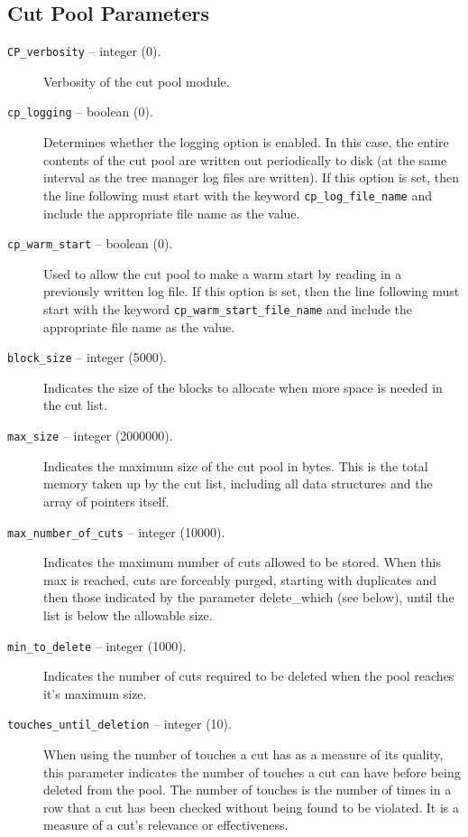 \subsection{Cut Pool Parameters}
\label{cut_pool_params}
\begin{description}

\item[{\tt CP\_verbosity} -- integer (0).]
Verbosity of the cut pool module.

\item[{\tt cp\_logging} -- boolean (0).]
Determines whether the logging option is enabled. In this case, the
entire contents of the cut pool are written out periodically to disk
(at the same interval as the tree manager log files are written). If
this option is set, then the line following must start with the
keyword {\tt cp\_log\_file\_name} and include the appropriate
file name as the value.

\item[{\tt cp\_warm\_start} -- boolean (0).]
Used to allow the cut pool to make a warm start by reading in a
previously written log file. If
this option is set, then the line following must start with the
keyword {\tt cp\_warm\_start\_file\_name} and include the appropriate
file name as the value.

\item[{\tt block\_size} -- integer (5000).]
Indicates the size of the blocks to allocate when more space is needed
in the cut list.

\item[{\tt max\_size} -- integer (2000000).]
Indicates the maximum size of the cut pool in bytes. This is the total
memory taken up by the cut list, including all data structures and the
array of pointers itself.

\item[{\tt max\_number\_of\_cuts} -- integer (10000).]
Indicates the maximum number of cuts allowed to be stored. When this
max is reached, cuts are forceably purged, starting with duplicates
and then those indicated by the parameter 
{delete_which} (see below), until the list is below the allowable size.

\item[{\tt min\_to\_delete} -- integer (1000).]
Indicates the number of cuts required to be deleted when the pool reaches
it's maximum size.

\item[{\tt touches\_until\_deletion} -- integer (10).]
When using the number of touches a cut has as a measure of its
quality, this parameter indicates the number of touches a cut can have
before being deleted from the pool. The number of touches is the
number of times in a row that a cut has been checked without being
found to be violated. It is a measure of a cut's relevance or
effectiveness.


\end{description}
